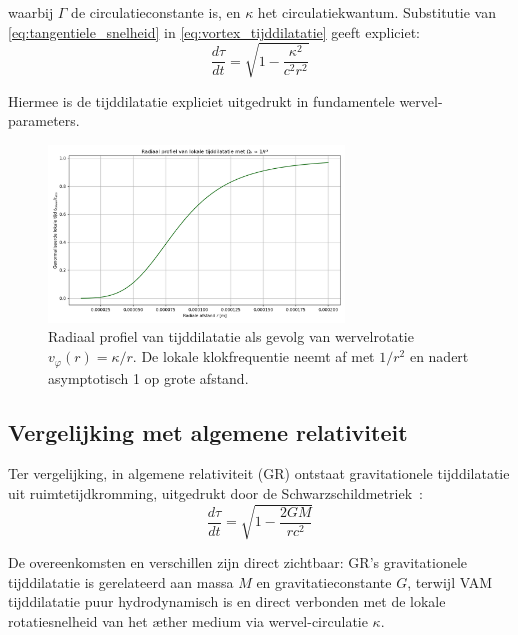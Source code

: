waarbij $\Gamma$ de circulatieconstante is, en $\kappa$ het circulatiekwantum. Substitutie van \eqref{eq:tangentiele_snelheid} in \eqref{eq:vortex_tijddilatatie} geeft expliciet:
\begin{equation}\label{eq:vortex_tijd_expliciet}
    \frac{d\tau}{dt} = \sqrt{1 - \frac{\kappa^2}{c^2 r^2}}
\end{equation}

Hiermee is de tijddilatatie expliciet uitgedrukt in fundamentele wervel-parameters.

\begin{figure}[H]
  \centering
  \includegraphics[width=0.7\textwidth]{02-RadialProfileOfLocalTimeDilation_Radial_LocalTime_Dilation_nl}
  \caption{Radiaal profiel van tijddilatatie als gevolg van wervelrotatie \( v_\varphi(r) = \kappa / r \). De lokale klokfrequentie neemt af met \(1/r^2\) en nadert asymptotisch 1 op grote afstand.}
  \label{fig:radiale_tijddilatatie}
\end{figure}


\subsection{Vergelijking met algemene relativiteit}

Ter vergelijking, in algemene relativiteit (GR) ontstaat gravitationele tijddilatatie uit ruimtetijdkromming, uitgedrukt door de Schwarzschildmetriek~\cite{schutz2009first}:
\begin{equation}\label{eq:GRtijd}
    \frac{d\tau}{dt} = \sqrt{1 - \frac{2GM}{rc^2}}
\end{equation}


De overeenkomsten en verschillen zijn direct zichtbaar: GR's gravitationele tijddilatatie is gerelateerd aan massa $M$ en gravitatieconstante $G$, terwijl VAM tijddilatatie puur hydrodynamisch is en direct verbonden met de lokale rotatiesnelheid van het æther medium via wervel-circulatie $\kappa$.

